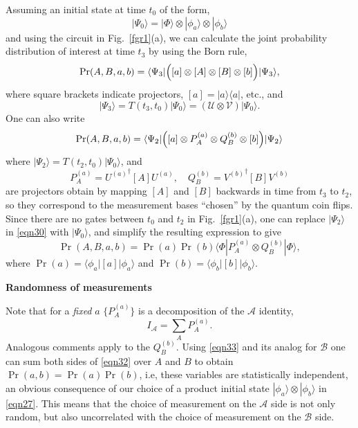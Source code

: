 \documentclass[10pt]{article} %
\def\outl#1{\par{\medskip\noindent\hspace*{.5cm}\bf
      \mathversion{bold}#1\mathversion{normal}\smallskip} }
\def\np{} \def\xa{} \def\xb{} \def\xn{} \def\xp{}
\def\outl#1{} \def\np{} \def\xa{} \def\xb{} \def\xn{} \def\xp{}
\def\outl#1{\par{\medskip\noindent\hspace*{.5cm}\bf
      \mathversion{bold}#1\mathversion{normal}\smallskip} }
\def\np{\newpage }\def\xn{\nopagebreak }\def\xp{\pagebreak }
\newcommand{\ad}{^\dagger }
\newcommand{\Blp}{\Bigl(}
\newcommand{\Brp}{\Bigr)}
\newcommand{\dya}[1]{|#1\rgl\lgl#1|}
\newcommand{\ket}[1]{|#1\rgl }
\newcommand{\lgl}{\langle }
\newcommand{\mte}[2]{\lgl#1|#2|#1\rgl }
\newcommand{\ot}{\otimes }
\newcommand{\rgl}{\rangle }
\newcommand{\AM}{{\mathcal A}}
\newcommand{\BM}{{\mathcal B}}
\newcommand{\UM}{{\mathcal U}}
\newcommand{\VM}{{\mathcal V}}
\begin{document}
Assuming an initial state at time $t_0$ of the form, 
\begin{equation}
  \ket{\Psi_0} = \ket{\Phi}\ot\ket{\phi_a}\ot\ket{\phi_b}
\label{eqn27}
\end{equation}
and using the circuit in Fig.~\ref{fgr1}(a), we can calculate the joint
probability distribution of interest at time $t_3$ by using the Born rule,
\begin{equation}
  \Pr(A,B,a,b) = \mte{\Psi_3}{\Blp [a]\ot[A]\ot[B]\ot[b] \Brp},
\label{eqn28}
\end{equation}
where square brackets indicate projectors, $[a]=\dya{a}$, etc., and
\begin{equation}
  \ket{\Psi_3} = T(t_3,t_0) \ket{\Psi_0} = (\UM\ot\VM) \ket{\Psi_0}.
\label{eqn29}
\end{equation}
One can also write 
\begin{equation}
  \Pr(A,B,a,b) = \mte{\Psi_2}{\Blp [a]\ot P^{(a)}_A\ot Q^{(b)}_B\ot[b]\Brp}
\label{eqn30}
\end{equation}
where $\ket{\Psi_2}=T(t_2,t_0)\ket{\Psi_0}$, and
\begin{equation}
  P^{(a)}_A = {U^{(a)}}\ad [A] U^{(a)},\quad 
 Q^{(b)}_B = {V^{(b)}}\ad [B] V^{(b)}
\label{eqn31}
\end{equation}
are projectors obtain by mapping $[A]$ and $[B]$ backwards in time from $t_3$
to $t_2$, so they correspond to the measurement bases ``chosen'' by the
quantum coin flips.  Since there are no gates between $t_0$ and $t_2$ in
Fig.~\ref{fgr1}(a), one can replace $\ket{\Psi_2}$ in \eqref{eqn30} with
$\ket{\Psi_0}$, and simplify the resulting expression to give
\begin{equation}
  \Pr(A,B,a,b) = \Pr(a)\Pr(b) \mte{\Phi}{P^{(a)}_A\ot Q^{(b)}_B},
\label{eqn32}
\end{equation}
where $\Pr(a)=\mte{\phi_a}{[a]}$ and $\Pr(b)=\mte{\phi_b}{[b]}$.

\xb
\outl{Randomness of measurements}
\xa


Note that for a
\emph{fixed} $a$ $\{P^{(a)}_A\}$ is a decomposition of the $\AM$
identity, 
\begin{equation}
  I_\AM = \sum_A P^{(a)}_A.
\label{eqn33}
\end{equation}
Analogous comments apply to the $Q^{(b)}_B$.  Using \eqref{eqn33} and its
analog for $\BM$ one can sum both sides of \eqref{eqn32} over $A$ and $B$ to
obtain $\Pr(a,b)=\Pr(a)\Pr(b)$, i.e, these variables are statistically
independent, an obvious consequence of our choice of a product initial state
$\ket{\phi_a}\ot\ket{\phi_b}$ in \eqref{eqn27}.  This means that the choice of
measurement on the $\AM$ side is not only random, but also uncorrelated with
the choice of measurement on the $\BM$ side.
\end{document}
